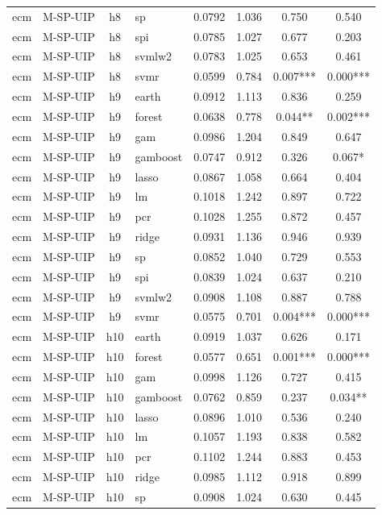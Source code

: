 \begin{ThreePartTable}
\begin{longtable}[t]{llclcccc}
ecm & M-SP-UIP & h8 & sp & 0.0792 & 1.036 & 0.750 & 0.540\\
ecm & M-SP-UIP & h8 & spi & 0.0785 & 1.027 & 0.677 & 0.203\\
ecm & M-SP-UIP & h8 & svmlw2 & 0.0783 & 1.025 & 0.653 & 0.461\\
ecm & M-SP-UIP & h8 & svmr & 0.0599 & 0.784 & 0.007*** & 0.000***\\
\addlinespace
ecm & M-SP-UIP & h9 & earth & 0.0912 & 1.113 & 0.836 & 0.259\\
ecm & M-SP-UIP & h9 & forest & 0.0638 & 0.778 & 0.044** & 0.002***\\
ecm & M-SP-UIP & h9 & gam & 0.0986 & 1.204 & 0.849 & 0.647\\
ecm & M-SP-UIP & h9 & gamboost & 0.0747 & 0.912 & 0.326 & 0.067*\\
ecm & M-SP-UIP & h9 & lasso & 0.0867 & 1.058 & 0.664 & 0.404\\
ecm & M-SP-UIP & h9 & lm & 0.1018 & 1.242 & 0.897 & 0.722\\
ecm & M-SP-UIP & h9 & pcr & 0.1028 & 1.255 & 0.872 & 0.457\\
ecm & M-SP-UIP & h9 & ridge & 0.0931 & 1.136 & 0.946 & 0.939\\
ecm & M-SP-UIP & h9 & sp & 0.0852 & 1.040 & 0.729 & 0.553\\
ecm & M-SP-UIP & h9 & spi & 0.0839 & 1.024 & 0.637 & 0.210\\
ecm & M-SP-UIP & h9 & svmlw2 & 0.0908 & 1.108 & 0.887 & 0.788\\
ecm & M-SP-UIP & h9 & svmr & 0.0575 & 0.701 & 0.004*** & 0.000***\\
\addlinespace
ecm & M-SP-UIP & h10 & earth & 0.0919 & 1.037 & 0.626 & 0.171\\
ecm & M-SP-UIP & h10 & forest & 0.0577 & 0.651 & 0.001*** & 0.000***\\
ecm & M-SP-UIP & h10 & gam & 0.0998 & 1.126 & 0.727 & 0.415\\
ecm & M-SP-UIP & h10 & gamboost & 0.0762 & 0.859 & 0.237 & 0.034**\\
ecm & M-SP-UIP & h10 & lasso & 0.0896 & 1.010 & 0.536 & 0.240\\
ecm & M-SP-UIP & h10 & lm & 0.1057 & 1.193 & 0.838 & 0.582\\
ecm & M-SP-UIP & h10 & pcr & 0.1102 & 1.244 & 0.883 & 0.453\\
ecm & M-SP-UIP & h10 & ridge & 0.0985 & 1.112 & 0.918 & 0.899\\
ecm & M-SP-UIP & h10 & sp & 0.0908 & 1.024 & 0.630 & 0.445\\

\end{longtable}
\end{ThreePartTable}
